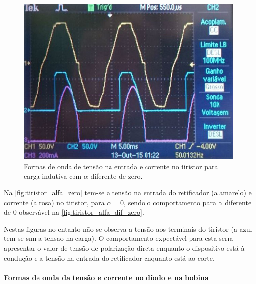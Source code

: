 \documentclass[a4paper,11pt]{article}
\numberwithin{equation}{section}
\begin{document}
\begin{figure}[H]
	\centering
	\includegraphics[keepaspectratio=true, scale=0.43]{img/figs/tiristor_alfa_dif_zero}
	\caption{Formas de onda de tensão na entrada e corrente no tiristor para carga indutiva com $\alpha$ diferente de zero.}
	\label{fig:tiristor_alfa_dif_zero}
	\vspace{-0.8em}
\end{figure}

Na \autoref{fig:tiristor_alfa_zero} tem-se a tensão na entrada do retificador (a amarelo) e corrente (a rosa) no tiristor, para $\alpha = 0$, sendo o comportamento para $\alpha$ diferente de $0$ observável na \autoref{fig:tiristor_alfa_dif_zero}.

Nestas figuras no entanto não se observa a tensão aos terminais do tiristor (a azul tem-se sim a tensão na carga). O comportamento expectável para esta seria apresentar o valor de tensão de polarização direta enquanto o dispositivo está à condução e a tensão na entrada do retificador enquanto está ao corte.

\paragraph{Formas de onda da tensão e corrente no díodo e na bobina}\mbox{}\
\end{document}
